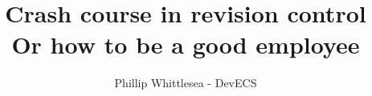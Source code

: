 \documentclass{beamer}
\title[Using Git like a baus]{Crash course in revision control\\Or how to be a good employee}
\author{Phillip Whittlesea - DevECS}
\institute{Electronics and Computer Science}
\begin{document}
\begin{frame}
    \titlepage
\end{frame}














%


\end{document}
